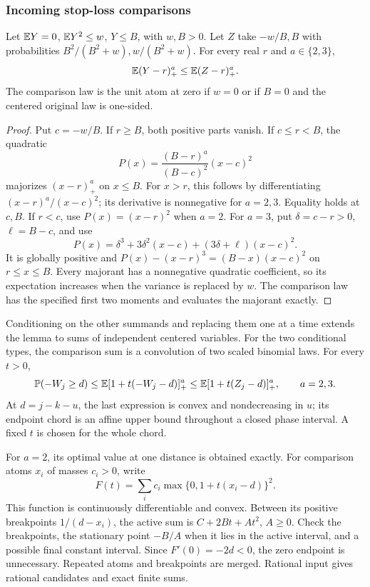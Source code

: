\subsubsection{Incoming stop-loss comparisons}

\begin{lemma}
\label{ms:finite:countcore:stoploss}
Let \(\mathbb E Y=0\), \(\mathbb E Y^2\le w\), \(Y\le B\), with
\(w,B>0\). Let \(Z\) take \(-w/B,B\) with probabilities
\(B^2/(B^2+w),w/(B^2+w)\). For every real \(r\) and
\(a\in\{2,3\}\),
\[
 \mathbb E(Y-r)_+^a\le\mathbb E(Z-r)_+^a.
\]
The comparison law is the unit atom at zero if \(w=0\) or if
\(B=0\) and the centered original law is one-sided.
\end{lemma}
\begin{proof}
Put \(c=-w/B\). If \(r\ge B\), both positive parts vanish.
If \(c\le r<B\), the quadratic
\[
 P(x)=\frac{(B-r)^a}{(B-c)^2}(x-c)^2
\]
majorizes \((x-r)_+^a\) on \(x\le B\). For \(x>r\), this
follows by differentiating \((x-r)^a/(x-c)^2\); its derivative is
nonnegative for \(a=2,3\). Equality holds at \(c,B\).
If \(r<c\), use \(P(x)=(x-r)^2\) when \(a=2\). For \(a=3\),
put \(\delta=c-r>0\), \(\ell=B-c\), and use
\[
 P(x)=\delta^3+3\delta^2(x-c)+(3\delta+\ell)(x-c)^2.
\]
It is globally positive and
\(P(x)-(x-r)^3=(B-x)(x-c)^2\) on \(r\le x\le B\).
Every majorant has a nonnegative quadratic coefficient, so its
expectation increases when the variance is replaced by \(w\).
The comparison law has the specified first two moments and evaluates
the majorant exactly.
\end{proof}

Conditioning on the other summands and replacing them one at a time
extends the lemma to sums of independent centered variables. For the two
conditional types, the comparison sum is a convolution of two scaled
binomial laws. For every \(t>0\),
\begin{equation}
 \mathbb P(-W_j\ge d)
 \le\mathbb E[1+t(-W_j-d)]_+^a
 \le\mathbb E[1+t(Z_j-d)]_+^a,
 \qquad a=2,3.
 \label{ms:finite:countcore:stoplosstail}
\end{equation}
At \(d=j-k-u\), the last expression is convex and nondecreasing
in \(u\); its endpoint chord is an affine upper bound throughout a
closed phase interval. A fixed \(t\) is chosen for the whole chord.

For \(a=2\), its optimal value at one distance is obtained exactly.
For comparison atoms \(x_i\) of masses \(c_i>0\), write
\[
 F(t)=\sum_i c_i\max\{0,1+t(x_i-d)\}^2.
\]
This function is continuously differentiable and convex. Between its
positive breakpoints \(1/(d-x_i)\), the active sum is
\(C+2Bt+At^2\), \(A\ge0\). Check the breakpoints, the stationary
point \(-B/A\) when it lies in the active interval, and a possible
final constant interval. Since \(F'(0)=-2d<0\), the zero endpoint
is unnecessary. Repeated atoms and breakpoints are merged. Rational
input gives rational candidates and exact finite sums.

